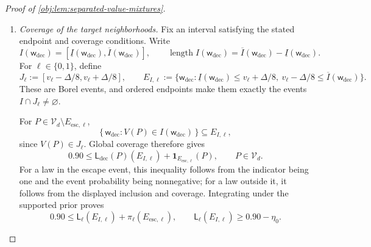 \documentclass[11pt]{article}
\begin{document}
\begin{proof}[Proof of \cref{obj:lem:separated-value-mixtures}]
\begin{enumerate}
Each supported prior average is bounded by the supremum on the causal class:
\[
\mathcal B_{\ell,T}
=
\int_{\mathcal V_d}\mathcal E_T(P)\,\pi_\ell(dP)
\le
\sup_{P\in\mathcal V_d}
\int
(T(\mathsf w_{\mathrm{dec}})-V(P))^2\,
\mathsf L_{\mathrm{dec}}(P)(d\mathsf w_{\mathrm{dec}}).
\]
If \(1-\omega-2\eta_0\ge0\), combining these inequalities gives the stated positive-part bound. If \(1-\omega-2\eta_0<0\), its positive part is zero and the bound follows from nonnegativity of squared risk. Finally, equality of the decision laws on \(\mathcal V_d\) identifies the supremum:
\[
\begin{aligned}
&\sup_{P\in\mathcal V_d}
\int
(T(\mathsf w_{\mathrm{dec}})-V(P))^2\,
\mathsf L_{\mathrm{dec}}(P)(d\mathsf w_{\mathrm{dec}})\\
&\qquad=
\sup_{P\in\mathcal V_d}
\mathbb E_{P,Q}\bigl[(T(\mathbf Z,R,U)-V(P))^2\bigr].
\end{aligned}
\]
This proves the risk assertion with its extended-nonnegative interpretation.

\item \textit{Coverage of the target neighborhoods.}
Fix an interval satisfying the stated endpoint and coverage conditions. Write
\[
I(\mathsf w_{\mathrm{dec}})
=
[\underline I(\mathsf w_{\mathrm{dec}}),
 \overline I(\mathsf w_{\mathrm{dec}})],
\qquad
\operatorname{length}I(\mathsf w_{\mathrm{dec}})
=
\overline I(\mathsf w_{\mathrm{dec}})
-\underline I(\mathsf w_{\mathrm{dec}}).
\]
For \(\ell\in\{0,1\}\), define
\[
J_\ell:=[v_\ell-\Delta/8,v_\ell+\Delta/8],
\qquad
E_{I,\ell}:=
\{\mathsf w_{\mathrm{dec}}:
\underline I(\mathsf w_{\mathrm{dec}})\le v_\ell+\Delta/8,\
v_\ell-\Delta/8\le\overline I(\mathsf w_{\mathrm{dec}})\}.
\]
These are Borel events, and ordered endpoints make them exactly the events
\(I\cap J_\ell\ne\varnothing\).

For \(P\in\mathcal V_d\setminus E_{\mathrm{esc},\ell}\),
\[
\{\,\mathsf w_{\mathrm{dec}}:
V(P)\in I(\mathsf w_{\mathrm{dec}})\,\}
\subseteq E_{I,\ell},
\]
since \(V(P)\in J_\ell\). Global coverage therefore gives
\[
0.90
\le
\mathsf L_{\mathrm{dec}}(P)(E_{I,\ell})
+\mathbf1_{E_{\mathrm{esc},\ell}}(P),
\qquad P\in\mathcal V_d.
\]
For a law in the escape event, this inequality follows from the indicator being one and the event probability being nonnegative; for a law outside it, it follows from the displayed inclusion and coverage. Integrating under the supported prior proves
\[
0.90
\le
\mathsf L_\ell(E_{I,\ell})
+\pi_\ell(E_{\mathrm{esc},\ell}),
\qquad
\mathsf L_\ell(E_{I,\ell})\ge0.90-\eta_0.
\]


\end{enumerate}
\end{proof}
\end{document}
